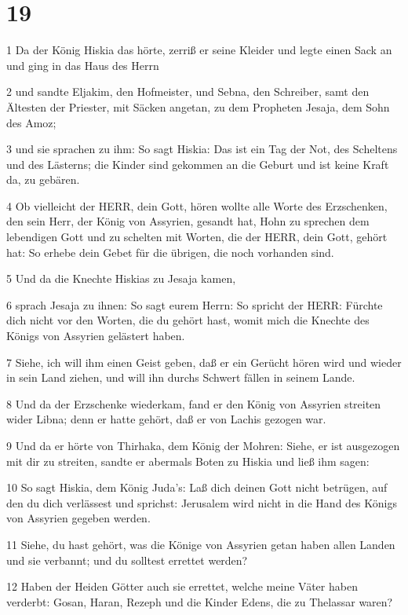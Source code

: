 \chapter{19}

\par 1 Da der König Hiskia das hörte, zerriß er seine Kleider und legte einen Sack an und ging in das Haus des Herrn
\par 2 und sandte Eljakim, den Hofmeister, und Sebna, den Schreiber, samt den Ältesten der Priester, mit Säcken angetan, zu dem Propheten Jesaja, dem Sohn des Amoz;
\par 3 und sie sprachen zu ihm: So sagt Hiskia: Das ist ein Tag der Not, des Scheltens und des Lästerns; die Kinder sind gekommen an die Geburt und ist keine Kraft da, zu gebären.
\par 4 Ob vielleicht der HERR, dein Gott, hören wollte alle Worte des Erzschenken, den sein Herr, der König von Assyrien, gesandt hat, Hohn zu sprechen dem lebendigen Gott und zu schelten mit Worten, die der HERR, dein Gott, gehört hat: So erhebe dein Gebet für die übrigen, die noch vorhanden sind.
\par 5 Und da die Knechte Hiskias zu Jesaja kamen,
\par 6 sprach Jesaja zu ihnen: So sagt eurem Herrn: So spricht der HERR: Fürchte dich nicht vor den Worten, die du gehört hast, womit mich die Knechte des Königs von Assyrien gelästert haben.
\par 7 Siehe, ich will ihm einen Geist geben, daß er ein Gerücht hören wird und wieder in sein Land ziehen, und will ihn durchs Schwert fällen in seinem Lande.
\par 8 Und da der Erzschenke wiederkam, fand er den König von Assyrien streiten wider Libna; denn er hatte gehört, daß er von Lachis gezogen war.
\par 9 Und da er hörte von Thirhaka, dem König der Mohren: Siehe, er ist ausgezogen mit dir zu streiten, sandte er abermals Boten zu Hiskia und ließ ihm sagen:
\par 10 So sagt Hiskia, dem König Juda's: Laß dich deinen Gott nicht betrügen, auf den du dich verlässest und sprichst: Jerusalem wird nicht in die Hand des Königs von Assyrien gegeben werden.
\par 11 Siehe, du hast gehört, was die Könige von Assyrien getan haben allen Landen und sie verbannt; und du solltest errettet werden?
\par 12 Haben der Heiden Götter auch sie errettet, welche meine Väter haben verderbt: Gosan, Haran, Rezeph und die Kinder Edens, die zu Thelassar waren?
